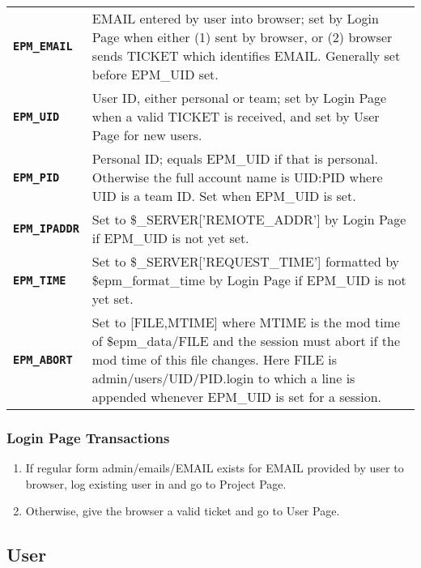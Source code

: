 \documentclass[12pt]{article}
\newenvironment{indpar}[1][0.4in]%
	{\begin{list}{}%
		     {\setlength{\itemsep}{0in}%
		      \setlength{\topsep}{0in}%
		      \setlength{\parsep}{1ex}%
		      \setlength{\labelwidth}{#1}%
		      \setlength{\leftmargin}{#1}%
		      \addtolength{\leftmargin}{\labelsep}}%
	 \item}%
	{\end{list}}
\newcommand{\TT}[1]{{\tt \bfseries #1}}
\begin{document}
\begin{indpar}
\begin{tabular}[t]{lp{4.0in}}
\TT{EPM\_EMAIL}\label{EPM_EMAIL}
    & EMAIL entered by user into browser; set by Login Page when either
      (1) sent by browser, or (2) browser sends TICKET which identifies
      EMAIL.  Generally set before EPM\_UID set.
\\[0.5ex]
\TT{EPM\_UID}\label{EPM_UID}
    & User ID, either personal or team; set by Login Page when a valid
      TICKET is received, and set by User Page for new users.
\\[0.5ex]
\TT{EPM\_PID}\label{EPM_PID}
    & Personal ID; equals EPM\_UID if that is personal.  Otherwise the full
      account name is UID:PID where UID is a team ID.
      Set when EPM\_UID is set.
\\[0.5ex]
\TT{EPM\_IPADDR}\label{EPM_IPADDR}
    & Set to \$\_SERVER['REMOTE\_ADDR'] by Login Page if EPM\_UID is
      not yet set.
\\[0.5ex]
\TT{EPM\_TIME}\label{EPM_TIME}
    & Set to \$\_SERVER['REQUEST\_TIME'] formatted by \$epm\_format\_time
      by Login Page if EPM\_UID is not yet set.
\\[0.5ex]
\TT{EPM\_ABORT}\label{EPM_ABORT}
    & Set to [FILE,MTIME] where MTIME is the mod time of \$epm\_data/FILE
      and the session must abort if the mod time of this file changes.
      Here FILE is admin/users/UID/PID.login to which a line is appended
      whenever EPM\_UID is set for a session.
\end{tabular}
\end{indpar}


\subsubsection{Login Page Transactions}

\begin{enumerate}
\item If regular form admin/emails/EMAIL exists for EMAIL provided by
      user to browser, log existing
      user in and go to Project Page.
\item Otherwise, give
      the browser a valid ticket and go to User Page.
\end{enumerate}


\subsection{User}
\end{document}
